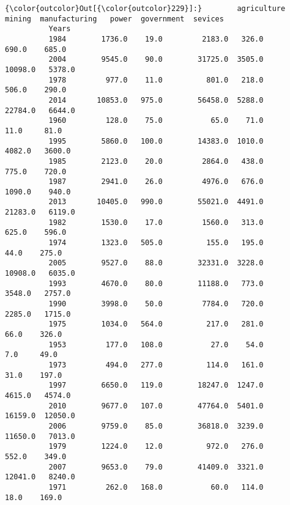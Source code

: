 \documentclass[11pt]{article}
\begin{document}
\begin{Verbatim}[commandchars=\\\{\}]
{\color{outcolor}Out[{\color{outcolor}229}]:}        agriculture  mining  manufacturing   power  government  sevices
          Years                                                                 
          1984        1736.0    19.0         2183.0   326.0       690.0    685.0
          2004        9545.0    90.0        31725.0  3505.0     10098.0   5378.0
          1978         977.0    11.0          801.0   218.0       506.0    290.0
          2014       10853.0   975.0        56458.0  5288.0     22784.0   6644.0
          1960         128.0    75.0           65.0    71.0        11.0     81.0
          1995        5860.0   100.0        14383.0  1010.0      4082.0   3600.0
          1985        2123.0    20.0         2864.0   438.0       775.0    720.0
          1987        2941.0    26.0         4976.0   676.0      1090.0    940.0
          2013       10405.0   990.0        55021.0  4491.0     21283.0   6119.0
          1982        1530.0    17.0         1560.0   313.0       625.0    596.0
          1974        1323.0   505.0          155.0   195.0        44.0    275.0
          2005        9527.0    88.0        32331.0  3228.0     10908.0   6035.0
          1993        4670.0    80.0        11188.0   773.0      3548.0   2757.0
          1990        3998.0    50.0         7784.0   720.0      2285.0   1715.0
          1975        1034.0   564.0          217.0   281.0        66.0    326.0
          1953         177.0   108.0           27.0    54.0         7.0     49.0
          1973         494.0   277.0          114.0   161.0        31.0    197.0
          1997        6650.0   119.0        18247.0  1247.0      4615.0   4574.0
          2010        9677.0   107.0        47764.0  5401.0     16159.0  12050.0
          2006        9759.0    85.0        36818.0  3239.0     11650.0   7013.0
          1979        1224.0    12.0          972.0   276.0       552.0    349.0
          2007        9653.0    79.0        41409.0  3321.0     12041.0   8240.0
          1971         262.0   168.0           60.0   114.0        18.0    169.0
\end{Verbatim}
            
\end{document}
